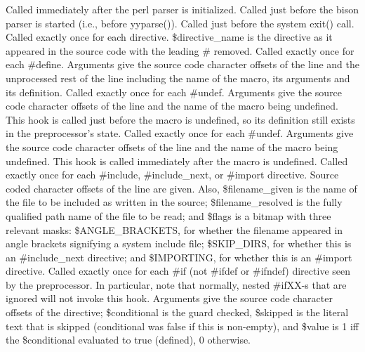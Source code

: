  Called immediately after the perl parser is initialized.
 Called just before the bison parser is started (i.e., before yyparse()).
 Called just before the system exit() call.
 Called exactly once for each directive.  \$directive\_\-name is
the directive as it appeared in the source code with the leading \# removed.
 Called exactly once for each \#define. 
Arguments give the source code character offsets of the line and the 
unprocessed rest of the line including the name of the macro, its arguments
and its definition.
 Called exactly once for each \#undef.
Arguments give the source code character offsets of the line and the
name of the macro being undefined.  This hook is called just before
the macro is undefined, so its definition still exists 
in the preprocessor's state.
 Called exactly once for each \#undef.
Arguments give the source code character offsets of the line and the
name of the macro being undefined.  This hook is called immediately after
the macro is undefined.
Called exactly once for each \#include,
\#include\_\-next, or \#import directive.  Source coded character offsets of
the line are given. Also, \$filename\_\-given is the name of the
file to be included as written in the source;  \$filename\_\-resolved is the
fully qualified path name of the file to be read; and  \$flags is a bitmap
with three relevant masks:  \$ANGLE\_\-BRACKETS, for whether the filename appeared
in angle brackets signifying a system include file; \$SKIP\_\-DIRS, for whether this
is an \#include\_\-next directive; and \$IMPORTING, for whether this is an \#import
directive.
Called exactly once for each \#if 
(not \#ifdef or \#ifndef) directive seen by the preprocessor. In particular,
note that normally, nested \#ifXX-s that are ignored will not invoke this hook.
Arguments give the source code character
offsets of the directive; \$conditional is the guard checked, \$skipped is
the literal text that is skipped (conditional was false if this is non-empty), and
\$value is 1 iff the \$conditional evaluated to true (defined), 0 otherwise.
